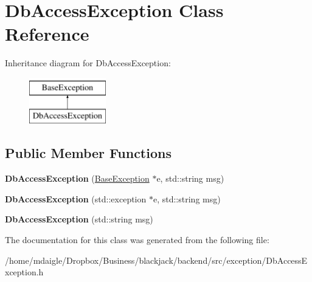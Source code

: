 \hypertarget{classDbAccessException}{
\section{\-Db\-Access\-Exception \-Class \-Reference}
\label{d7/d15/classDbAccessException}
}
\-Inheritance diagram for \-Db\-Access\-Exception\-:\begin{figure}[H]
\begin{center}
\leavevmode
\includegraphics[height=2.000000cm]{d7/d15/classDbAccessException}
\end{center}
\end{figure}
\subsection*{\-Public \-Member \-Functions}
\begin{DoxyCompactItemize}
\item 
\hypertarget{classDbAccessException_acbf20878878697e7129a1596374ba0b9}{
{\bfseries \-Db\-Access\-Exception} (\hyperlink{classBaseException}{\-Base\-Exception} $\ast$e, std\-::string msg)}
\label{d7/d15/classDbAccessException_acbf20878878697e7129a1596374ba0b9}

\item 
\hypertarget{classDbAccessException_a5efe5ca50e564504ced1189d6e796817}{
{\bfseries \-Db\-Access\-Exception} (std\-::exception $\ast$e, std\-::string msg)}
\label{d7/d15/classDbAccessException_a5efe5ca50e564504ced1189d6e796817}

\item 
\hypertarget{classDbAccessException_a5fe5fccb24ed11c27ed60e1d87e66c8e}{
{\bfseries \-Db\-Access\-Exception} (std\-::string msg)}
\label{d7/d15/classDbAccessException_a5fe5fccb24ed11c27ed60e1d87e66c8e}

\end{DoxyCompactItemize}


\-The documentation for this class was generated from the following file\-:\begin{DoxyCompactItemize}
\item 
/home/mdaigle/\-Dropbox/\-Business/blackjack/backend/src/exception/\-Db\-Access\-Exception.\-h\end{DoxyCompactItemize}
